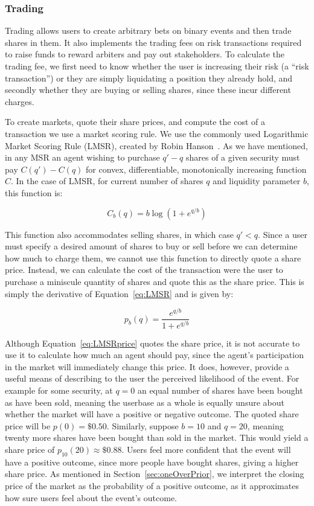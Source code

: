 \documentclass[10pt,a4paper]{article}
\theoremstyle{plain}
\theoremstyle{definition}
\begin{document}
\subsubsection{Trading}

Trading allows users to create arbitrary bets on binary events and then trade
shares in them. It also implements the trading fees on risk transactions
required to raise funds to reward arbiters and pay out stakeholders. To
calculate the trading fee, we first need to know whether the user is increasing
their risk (a ``risk transaction'') or they are simply liquidating a position
they already hold, and secondly whether they are buying or selling shares,
since these incur different charges.

To create markets, quote their share prices, and compute the cost of a
transaction we use a market scoring rule. We use the commonly used Logarithmic
Market Scoring Rule (LMSR), created by Robin Hanson~\cite{LMSR}. As we have
mentioned, in any MSR an agent wishing to purchase $q'-q$ shares of a given
security must pay $C(q')-C(q)$ for convex, differentiable, monotonically
increasing function $C$. In the case of LMSR, for current number of shares $q$
and liquidity parameter $b$, this function is:

\begin{equation}
	\label{eq:LMSR}
	C_b(q) = b \log (1 + e^{q/b})
\end{equation}

This function also accommodates selling shares, in which case $q'<q$.  Since a
user must specify a desired amount of shares to buy or sell before we can
determine how much to charge them, we cannot use this function to directly
quote a share price. Instead, we can calculate the cost of the transaction were
the user to purchase a miniscule quantity of shares and quote this as the share
price. This is simply the derivative of Equation~\ref{eq:LMSR} and is given by:

\begin{equation}
	\label{eq:LMSRprice}
	p_b(q) = \frac{ e^{q/b} }{ 1 + e^{q/b} }
\end{equation}

Although Equation~\ref{eq:LMSRprice} quotes the share price, it is not accurate
to use it to calculate how much an agent should pay, since the agent's
participation in the market will immediately change this price. It does,
however, provide a useful means of describing to the user the perceived
likelihood of the event. For example for some security, at $q=0$ an equal
number of shares have been bought as have been sold, meaning the userbase as a
whole is equally unsure about whether the market will have a positive or
negative outcome. The quoted share price will be $p(0)=\$0.50$.  Similarly,
suppose $b=10$ and $q=20$, meaning twenty more shares have been bought than
sold in the market. This would yield a share price of $p_{10}(20) \approx
\$0.88$. Users feel more confident that the event will have a positive outcome,
since more people have bought shares, giving a higher share price. As mentioned
in Section~\ref{sec:oneOverPrior}, we interpret the closing price of the market
as the probability of a positive outcome, as it approximates how sure users
feel about the event's outcome.
\end{document}
